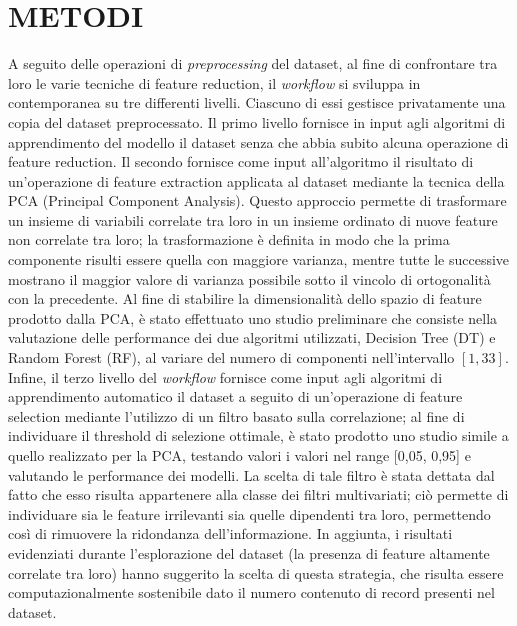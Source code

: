 \section{METODI}
A seguito delle operazioni di \textit{preprocessing} del dataset, al fine di confrontare tra loro le varie tecniche di feature reduction, il \textit{workflow} si sviluppa in contemporanea su tre differenti livelli.
Ciascuno di essi gestisce privatamente una copia del dataset preprocessato.
Il primo livello fornisce in input agli algoritmi di apprendimento del modello il dataset senza che abbia subito alcuna operazione di feature reduction.
Il secondo fornisce come input all'algoritmo il risultato di un'operazione di feature extraction applicata al dataset mediante la tecnica della PCA (Principal Component Analysis). Questo approccio permette di trasformare un insieme di variabili correlate tra loro in un insieme ordinato di nuove feature non correlate tra loro; la trasformazione è definita in modo che la prima componente risulti essere quella con maggiore varianza, mentre tutte le successive mostrano il maggior valore di varianza possibile sotto il vincolo di ortogonalità con la precedente.
Al fine di stabilire la dimensionalità dello spazio di feature prodotto dalla PCA, è stato effettuato uno studio preliminare che consiste nella valutazione delle performance dei due algoritmi utilizzati, Decision Tree (DT) e Random Forest (RF), al variare del numero di componenti nell'intervallo $[1, 33]$.\\
Infine, il terzo livello del \textit{workflow} fornisce come input agli algoritmi di apprendimento automatico il dataset a seguito di un'operazione di feature selection mediante l'utilizzo di un filtro basato sulla correlazione; al fine di individuare il threshold di selezione ottimale, è stato prodotto uno studio simile a quello realizzato per la PCA, testando valori i valori nel range [0,05, 0,95] e valutando le performance dei modelli.
La scelta di tale filtro è stata dettata dal fatto che esso risulta appartenere alla classe dei filtri multivariati; ciò permette di individuare sia le feature irrilevanti sia quelle dipendenti tra loro, permettendo così di rimuovere la ridondanza dell'informazione. 
In aggiunta, i risultati evidenziati durante l'esplorazione del dataset (la presenza di feature altamente correlate tra loro) hanno suggerito la scelta di questa strategia, che risulta essere computazionalmente sostenibile dato il numero contenuto di record presenti nel dataset.

